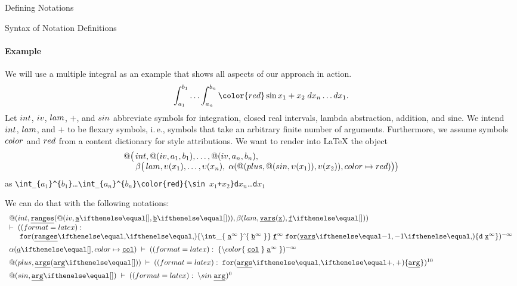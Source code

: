 \begin{omgroup}[creators=miko,short={Notation and Presentation},id=pres]
\begin{omgroup}[creators={miko,frabe},id=sec:ntn-definition]{Defining Notations}
\begin{omgroup}[id=sec:nd:syntax]{Syntax of Notation Definitions}
\paragraph{Example}
We will use a multiple integral as an example that shows all aspects of our approach in action. 
\[\int_{a_1}^{b_1}\ldots\int_{a_n}^{b_n} {\color{red}\sin x_1+x_2} \; d x_n \ldots d x_1.\]
Let $\mathop{int}$, $\mathop{iv}$, $\mathop{lam}$, $\plus$, and $\mathop{sin}$ abbreviate symbols for integration, closed
real intervals, lambda abstraction, addition, and sine. We intend $\mathop{int}$, $\mathop{lam}$, and
$\plus$ to be flexary symbols, i.\,e., symbols that take an arbitrary finite number of
arguments. Furthermore, we assume symbols $\mathop{color}$ and $\mathop{red}$ from a content dictionary for
style attributions. We want to render into {\LaTeX} the {\openmath} object
\[\begin{array}{l}
   @\big(\mathop{int},@(\mathop{iv},a_1,b_1),\ldots,@(\mathop{iv},a_n,b_n),\\
   \hspace*{.5cm} \beta\big(\mathop{lam},\upsilon(x_1),\ldots,\upsilon(x_n), \; \alpha(@(plus,@(\mathop{sin},\upsilon(x_1)),\upsilon(x_2)),\mathop{color}\mapsto\mathop{red})\big)\big)
\end{array}\]
as \verb|\int_{|$a_1$\verb|}^{|$b_1$\verb|}|\ldots\verb|\int_{|$a_n$\verb|}^{|$b_n$\verb|}\color{red}{\sin |$x_1$\verb|+|$x_2$\verb|}d|$x_n$\ldots\verb|d|$x_1$

We can do that with the following notations:
\[\mathll{
@(\intg,\JLst{\mathtt{ranges}}{@(\iv,\JObj{\mathtt{a}},\JObj{\mathtt{b}})},\beta(\lam,\JLst{\mathtt{vars}}{\JVar{\mathtt{x}}},\JObj{\mathtt{f}})) \\
\vdash \;
 ((format=latex):\\\tb
  \PIIterate[]
    {\mathtt{ranges}}
    {}
    {\PIText{\mathtt{\backslash int\_\{}\;\PIRecurse{\mathtt{a}}{\infty}\;\PIText{\}\caret\{}\;\PIRecurse{\mathtt{b}}{\infty}\;\PIText{\}}}}\;
  \PIRecurse{\mathtt{f}}{\infty}\;
  \PIIterate[-1]
    {\mathtt{vars}}
    {}
    {\PIText{\mathtt{d}}\;\PIRecurse{\mathtt{x}}{\infty}}
)^{-\infty}
\\[.2cm]

\omattr{\JObj{a}}{\colr}{\JSym{\mathtt{col}}} \;
\vdash \;
 ((format=latex):\;\PIText{\{\backslash color\{}\;\PINameOf{\mathtt{col}}\;\PIText{\}}\;\PIRecurse{\mathtt{a}}{\infty}\;\PIText{\}})^{-\infty}
\\[.2cm]

@(\plus,\JLst{\mathtt{args}}{\JObj{\mathtt{arg}}}) \;
\vdash \;
 ((format=latex):\;\PIIterate{\mathtt{args}}{\PIText{\mathtt{+}}}{\PIRecurse{\mathtt{arg}}{}})^{10}
\\[.2cm]

@(\sins,\JObj{\mathtt{arg}}) \;
\vdash \;
 ((format=latex):\;\backslash sin\; \PIRecurse{\mathtt{arg}}{})^{0}
\\[.2cm]

}\]
\end{omgroup}
\end{omgroup}
\end{omgroup}
